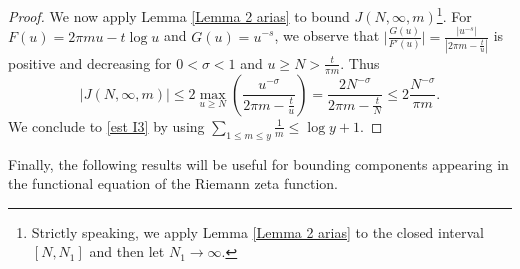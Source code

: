 \documentclass[11pt,letterpaper,oneside,reqno]{amsart}
\renewcommand{\^}[1]{\widehat{#1}}
\numberwithin{equation}{section}
\theoremstyle{remark}
\begin{document}
\begin{proof}
We now apply Lemma \ref{Lemma 2 arias} to bound $J(N,\infty,m)$\footnote{Strictly speaking, we apply Lemma \ref{Lemma 2 arias} to the closed interval $[N,N_1]$ and then let $N_1\to\infty$.}. For $F(u)= 2\pi mu-t\log u$ and $G(u)=u^{-s}$, 
% 
we observe that $\big| \frac{G(u)}{F'(u)}\big|
=\frac{|u^{-s}|}{|2\pi m-\frac{t}{u}|}$ %
is positive and decreasing for $0<\sigma<1$ and $u \ge N > \frac{t}{\pi m}$. Thus
%
\begin{equation}  
    |J(N,\infty,m)|
    \le 2 \max_{u \geq N} \left(\frac{u^{-\sigma}}{2\pi m - \frac{t}{u}}\right) 
    = \frac{2 N^{-\sigma}}{2\pi m - \frac{t}{N}}
     \le2 \frac{N^{-\sigma}}{\pi m}.
\end{equation}
We conclude to \eqref{est I3} by using $ \sum_{1 \leq m \leq  y } \frac{1}{m} \leq \log y + 1$. 
\end{proof}
%
Finally, the following results will be useful for bounding components appearing in the functional equation of the Riemann zeta function.
%
\end{document}
